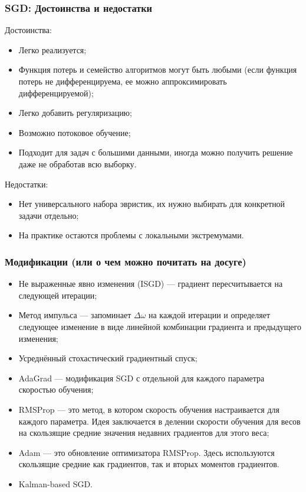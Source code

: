 \documentclass[11pt]{beamer}
\begin{document}
	\begin{frame}
		\frametitle{SGD: Достоинства и недостатки}
		Достоинства:
		\begin{itemize}
			\item Легко реализуется;
			\item Функция потерь и семейство алгоритмов могут быть любыми (если функция потерь не дифференцируема, ее можно аппроксимировать дифференцируемой);
			\item Легко добавить регуляризацию;
			\item Возможно потоковое обучение;
			\item Подходит для задач с большими данными, иногда можно получить решение даже не обработав всю выборку.
		\end{itemize}
	
		Недостатки:
		\begin{itemize}
			\item Нет универсального набора эвристик, их нужно выбирать для конкретной задачи отдельно;
	 		\item На практике остаются проблемы с локальными экстремумами.
		\end{itemize}
	\end{frame}
	
	\begin{frame}
		\frametitle{Модификации (или о чем можно почитать на досуге)}
		\begin{itemize}
			\item Не выраженные явно изменения (ISGD) --- градиент пересчитывается на следующей итерации;
			\item Метод импульса --- запоминает $ \Delta\omega $ на каждой итерации и определяет следующее изменение в виде линейной комбинации градиента и предыдущего изменения;
			\item Усреднённый стохастический градиентный спуск;
			\item AdaGrad --- модификация SGD с отдельной для каждого параметра скоростью обучения;
			\item RMSProp --- это метод, в котором скорость обучения настраивается для каждого параметра. Идея заключается в делении скорости обучения для весов на скользящие средние значения недавних градиентов для этого веса;
			\item Adam --- это обновление оптимизатора RMSProp. Здесь используются скользящие средние как градиентов, так и вторых моментов градиентов.
			\item Kalman-based SGD.
		\end{itemize}
	\end{frame}
	
	

		
\end{document}
